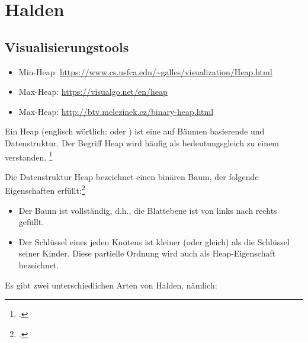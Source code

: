\documentclass{lehramt-informatik-haupt}
\begin{document}

\chapter{Halden}

\begin{quellen}
\item \cite[Seite 25-32]{aud:fs:tafeluebung-11}
\item \cite{wiki:heap}
\item \cite[Seite 407-409 (PDF 423-425), Kapitel 14.6.1]{saake}
\end{quellen}

\section{Visualisierungstools}

\begin{itemize}
\item Min-Heap: \url{https://www.cs.usfca.edu/~galles/visualization/Heap.html}
\item Max-Heap: \url{https://visualgo.net/en/heap}
\item Max-Heap: \url{http://btv.melezinek.cz/binary-heap.html}
\end{itemize}

\noindent
Ein Heap (englisch wörtlich:  oder ) ist
eine auf Bäumen basierende  und
 Datenstruktur.
%
Der Begriff Heap wird häufig als bedeutungsgleich zu einem
 verstanden.
\footcite{wiki:heap}

Die Datenstruktur Heap bezeichnet einen binären Baum, der folgende
Eigenschaften erfüllt:\footcite[Seite 407 (PDF 423), Kapitel 14.6.1]{saake}

\begin{itemize}
\item Der Baum ist vollständig, d.h., die Blattebene ist von links nach
rechts gefüllt.

\item Der Schlüssel eines jeden Knotens ist kleiner (oder gleich) als
die Schlüssel seiner Kinder. Diese partielle Ordnung wird auch als
Heap-Eigenschaft bezeichnet.
\end{itemize}

%
Es gibt zwei unterschiedlichen Arten von Halden, nämlich:
\end{document}
